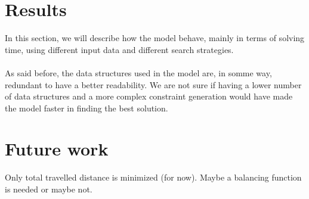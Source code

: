 \documentclass[10pt]{article}
\begin{document}
	\section{Results}
	\label{Results}

	In this section, we will describe how the model behave, mainly in terms of solving
	time, using different input data and different search strategies.



	\paragraph*{}
	As said before, the data structures used in the model are, in somme way, redundant
	to have a better readability. We are not sure if having a lower number of data 
	structures and a more complex constraint generation would have made the model
	faster in finding the best solution.
	


	\section{Future work}
	\label{Future work}
	Only total travelled distance is minimized (for now). Maybe a balancing 
	function is needed or maybe not.
\end{document}
